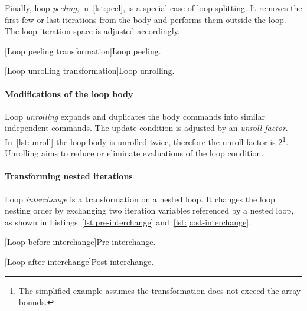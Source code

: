 Finally, loop \emph{peeling}, in~\autoref{lst:peel}, is a special case of loop splitting.
It removes the first few or last iterations from the body and performs them outside the loop.
The loop iteration space is adjusted accordingly.

\begin{center}
\begin{minipage}{\textwidth}
\captionsetup{type=lstlisting}
\begin{minipage}[t]{.45\textwidth}
[Loop peeling transformation]{Loop peeling.}
\label{lst:peel}
\end{minipage}\hfill%
\begin{minipage}[t]{.45\textwidth}
[Loop unrolling transformation]{Loop unrolling.}
\label{lst:unroll}
\end{minipage}
\end{minipage}
\end{center}

\paragraph*{Modifications of the loop body}
Loop \emph{unrolling} expands and duplicates the body commands into similar independent commands.
The update condition is adjusted by an \emph{unroll factor}.
In~\autoref{lst:unroll} the loop body is unrolled twice, therefore the unroll factor is 2\footnote{
The simplified example assumes the transformation does not exceed the array bounds.}.
Unrolling aims to reduce or eliminate evaluations of the loop condition.

\paragraph*{Transforming nested iterations}

Loop \emph{interchange} is a transformation on a nested loop.
It changes the loop nesting order by exchanging two iteration variables referenced by a nested loop,
as shown in Listings~\ref{lst:pre-interchange} and~\ref{lst:post-interchange}.

\begin{center}
\begin{minipage}{\textwidth}
\captionsetup{type=lstlisting}
\begin{minipage}[t]{.45\textwidth}
[Loop before interchange]{Pre-interchange.}
\label{lst:pre-interchange}
\end{minipage}\hfill%
\begin{minipage}[t]{.45\textwidth}
[Loop after interchange]{Post-interchange.}
\label{lst:post-interchange}
\end{minipage}
\end{minipage}
\end{center}

